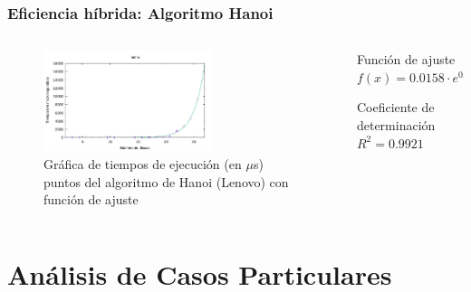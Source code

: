 \documentclass[8pt, aspectratio=169]{beamer}
\begin{document}
    \begin{frame}
        \frametitle{Eficiencia híbrida: Algoritmo Hanoi}

        \begin{columns}
            \begin{column}{0.7\textwidth}
                \begin{figure}
                    \includegraphics[width=0.65\textwidth]{../data/lenovo/hanoi-graph.pdf}
                    \caption{Gráfica de tiempos de ejecución (en $\mu$s) puntos del algoritmo de Hanoi (Lenovo) con función de ajuste}
                \end{figure}
            \end{column}

            \begin{column}{0.3\textwidth}
                \begin{block}{Función de ajuste}
                    $f(x) = 0.0158 \cdot e^{0.503814 x}$
                \end{block}

                \begin{block}{Coeficiente de determinación}
                    $R^2 = 0.9921$
                \end{block}
            \end{column}
        \end{columns}
    \end{frame}

    \section{Análisis de Casos Particulares}
\end{document}
